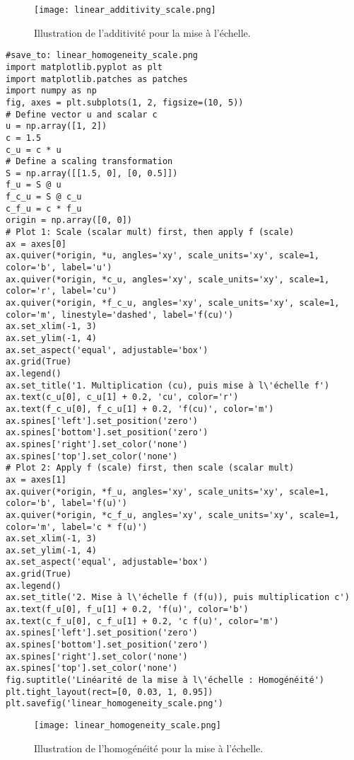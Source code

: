 \begin{figure}[H]
\centering
\texttt{[image: linear\_additivity\_scale.png]}
\caption{Illustration de l'additivité pour la mise à l'échelle.}
\label{fig:linear_additivity_scale}
\end{figure}
\begin{verbatim}
#save_to: linear_homogeneity_scale.png
import matplotlib.pyplot as plt
import matplotlib.patches as patches
import numpy as np
fig, axes = plt.subplots(1, 2, figsize=(10, 5))
# Define vector u and scalar c
u = np.array([1, 2])
c = 1.5
c_u = c * u
# Define a scaling transformation
S = np.array([[1.5, 0], [0, 0.5]])
f_u = S @ u
f_c_u = S @ c_u
c_f_u = c * f_u
origin = np.array([0, 0])
# Plot 1: Scale (scalar mult) first, then apply f (scale)
ax = axes[0]
ax.quiver(*origin, *u, angles='xy', scale_units='xy', scale=1, color='b', label='u')
ax.quiver(*origin, *c_u, angles='xy', scale_units='xy', scale=1, color='r', label='cu')
ax.quiver(*origin, *f_c_u, angles='xy', scale_units='xy', scale=1, color='m', linestyle='dashed', label='f(cu)')
ax.set_xlim(-1, 3)
ax.set_ylim(-1, 4)
ax.set_aspect('equal', adjustable='box')
ax.grid(True)
ax.legend()
ax.set_title('1. Multiplication (cu), puis mise à l\'échelle f')
ax.text(c_u[0], c_u[1] + 0.2, 'cu', color='r')
ax.text(f_c_u[0], f_c_u[1] + 0.2, 'f(cu)', color='m')
ax.spines['left'].set_position('zero')
ax.spines['bottom'].set_position('zero')
ax.spines['right'].set_color('none')
ax.spines['top'].set_color('none')
# Plot 2: Apply f (scale) first, then scale (scalar mult)
ax = axes[1]
ax.quiver(*origin, *f_u, angles='xy', scale_units='xy', scale=1, color='b', label='f(u)')
ax.quiver(*origin, *c_f_u, angles='xy', scale_units='xy', scale=1, color='m', label='c * f(u)')
ax.set_xlim(-1, 3)
ax.set_ylim(-1, 4)
ax.set_aspect('equal', adjustable='box')
ax.grid(True)
ax.legend()
ax.set_title('2. Mise à l\'échelle f (f(u)), puis multiplication c')
ax.text(f_u[0], f_u[1] + 0.2, 'f(u)', color='b')
ax.text(c_f_u[0], c_f_u[1] + 0.2, 'c f(u)', color='m')
ax.spines['left'].set_position('zero')
ax.spines['bottom'].set_position('zero')
ax.spines['right'].set_color('none')
ax.spines['top'].set_color('none')
fig.suptitle('Linéarité de la mise à l\'échelle : Homogénéité')
plt.tight_layout(rect=[0, 0.03, 1, 0.95])
plt.savefig('linear_homogeneity_scale.png')
\end{verbatim}
\begin{figure}[H]
\centering
\texttt{[image: linear\_homogeneity\_scale.png]}
\caption{Illustration de l'homogénéité pour la mise à l'échelle.}
\label{fig:linear_homogeneity_scale}
\end{figure}
